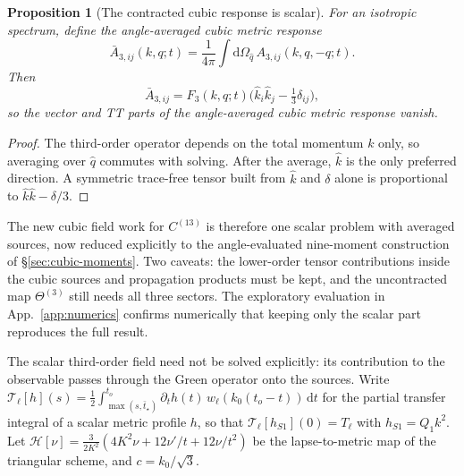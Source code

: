 \documentclass[11pt]{article}
\newtheorem{proposition}[theorem]{Proposition}
\theoremstyle{definition}
\theoremstyle{remark}
\newcommand{\dd}{\mathrm{d}}
\begin{document}
\begin{proposition}[The contracted cubic response is scalar]\label{prop:contracted}
For an isotropic spectrum, define the angle-averaged cubic metric response
\[
\bar A_{3,ij}(k,q;t)=\frac1{4\pi}\int\dd\Omega_{\hat q}\,A_{3,ij}(k,q,-q;t).
\]
Then
\[
\bar A_{3,ij}=F_3(k,q;t)\Big(\hat k_i\hat k_j-\tfrac13\delta_{ij}\Big),
\]
so the vector and TT parts of the angle-averaged cubic metric response vanish.
\end{proposition}
\begin{proof}
The third-order operator depends on the total momentum $k$ only, so averaging over $\hat q$
commutes with solving. After the average, $\hat k$ is the only preferred direction. A
symmetric trace-free tensor built from $\hat k$ and $\delta$ alone is proportional to
$\hat k\hat k-\delta/3$.
\end{proof}
The new cubic field work for $C^{(13)}$ is therefore one scalar problem with averaged
sources, now reduced explicitly to the angle-evaluated nine-moment construction of
\S\ref{sec:cubic-moments}. Two caveats: the lower-order tensor contributions inside the cubic sources and
propagation products must be kept, and the uncontracted map $\Theta^{(3)}$ still needs all
three sectors. The exploratory evaluation in App.~\ref{app:numerics} confirms numerically that
keeping only the scalar part reproduces the full result.

The scalar third-order field need not be solved explicitly: its contribution to the observable passes
through the Green operator onto the sources. Write
$\mathcal T_\ell[h](s)=\frac12\int_{\max(s,\bar t_\star)}^{t_o}\partial_th(t)\,w_\ell(k_0(t_o-t))\,\dd t$
for the partial transfer integral of a scalar metric profile $h$, so that
$\mathcal T_\ell[h_{S1}](0)=T_\ell$ with $h_{S1}=Q_1k^2$. Let
$\mathcal H[\nu]=\frac{3}{2K^2}(4K^2\nu+12\nu'/t+12\nu/t^2)$ be the lapse-to-metric map of the
triangular scheme, and $c=k_0/\sqrt3$.
\end{document}

